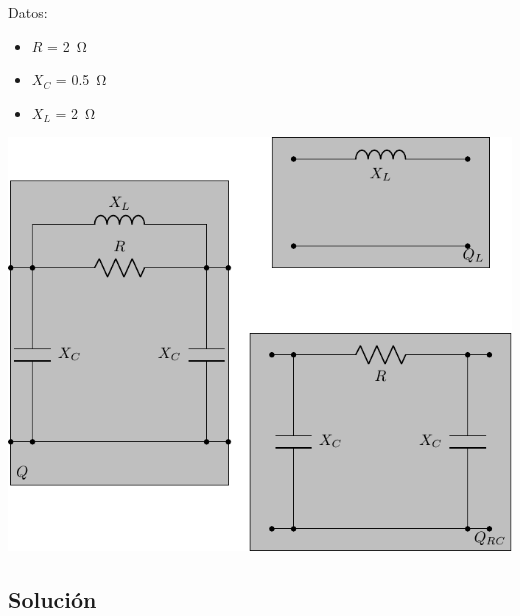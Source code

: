 \documentclass[12pt]{article}
\begin{document}
\begin{minipage}{0.2\textwidth}
  Datos:
  \begin{itemize}
  \item $R$ = \SI{2}{\ohm}
  \item $X_C$ = \SI{0.5}{\ohm}
  \item $X_L$ = \SI{2}{\ohm}
  \end{itemize}
\end{minipage}
\begin{minipage}{0.8\textwidth}
  \includegraphics{figs/Cuadripolo_T_puenteada.pdf}
\end{minipage}

\subsection*{Solución}
\end{document}
